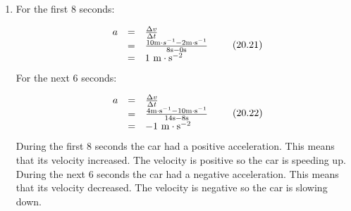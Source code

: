 {\begin{mdframed}[linewidth=4, leftmargin=40, rightmargin=40]
\begin{exercise}
\begin{enumerate}[noitemsep, label=\textbf{Step} \textbf{\arabic*}. ]
    \begin{equation}
    \begin{array}{ccc}\hfill {v}_{i}& =& 10\phantom{\rule{3.33333pt}{0ex}}\mathrm{m}\ensuremath{\cdot}{\mathrm{s}}^{-1}\hfill \\ \hfill {v}_{f}& =& 4\phantom{\rule{3.33333pt}{0ex}}\mathrm{m}\ensuremath{\cdot}{\mathrm{s}}^{-1}\hfill \\ \hfill {t}_{i}& =& 8\phantom{\rule{3.33333pt}{0ex}}\mathrm{s}\hfill \\ \hfill {t}_{f}& =& 14\phantom{\rule{3.33333pt}{0ex}}\mathrm{s}\hfill \end{array}\tag{20.20}
      \end{equation}
      \item  
      \label{m38794*id68246}For the first 8 seconds:\par 
      \label{m38794*id68252}\nopagebreak\noindent{}
    \begin{equation}
    \begin{array}{ccc}\hfill a& =& \frac{\Delta v}{\Delta t}\hfill \\ & =& \frac{10\mathrm{m}\ensuremath{\cdot}{s}^{-1}-2\mathrm{m}\ensuremath{\cdot}{\mathrm{s}}^{-1}}{8\mathrm{s}-0\mathrm{s}}\hfill \\ & =& 1\phantom{\rule{3.33333pt}{0ex}}\mathrm{m}\ensuremath{\cdot}{\mathrm{s}}^{-2}\hfill \end{array}\tag{20.21}
      \end{equation}
      \label{m38794*id68396}For the next 6 seconds:\par 
      \label{m38794*id68402}\nopagebreak\noindent{}
    \begin{equation}
    \begin{array}{ccc}\hfill a& =& \frac{\Delta v}{\Delta t}\hfill \\ & =& \frac{4\mathrm{m}\ensuremath{\cdot}{\mathrm{s}}^{-1}-10\mathrm{m}\ensuremath{\cdot}{\mathrm{s}}^{-1}}{14\mathrm{s}-8\mathrm{s}}\hfill \\ & =& -1\phantom{\rule{3.33333pt}{0ex}}\mathrm{m}\ensuremath{\cdot}{\mathrm{s}}^{-2}\hfill \end{array}\tag{20.22}
      \end{equation}
      \label{m38794*id68543}During the first 8 seconds the car had a positive acceleration. This means that its velocity increased. The velocity is positive so the car is speeding up.
During the next 6 seconds the car had a negative acceleration. This means that its velocity decreased. The velocity is negative so the car is slowing down. \par 
      \end{enumerate}
    \end{exercise}
    \end{mdframed}
    }
